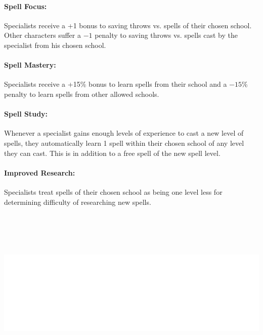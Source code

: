 \begin{multicols}{2}
\paragraph{Spell Focus:} Specialists receive a +1 bonus to saving throws vs. spells of their chosen school.  Other characters suffer a $-1$ penalty to saving throws vs. spells cast by the specialist from his chosen school.

\paragraph{Spell Mastery:} Specialists receive a +15\% bonus to learn spells from their school and a $-15$\% penalty to learn spells from other allowed schools.  

\paragraph{Spell Study:} Whenever a specialist gains enough levels of experience to cast a new level of spells, they automatically learn 1 spell within their chosen school of any level they can cast. This is in addition to a free spell of the new spell level.
 
\paragraph{Improved Research:} Specialists treat spells of their chosen school as being one level less for determining difficulty of researching new spells.

\noindent\includegraphics[width=\columnwidth, height=3.25in]{testblock.pdf} 


\end{multicols}

